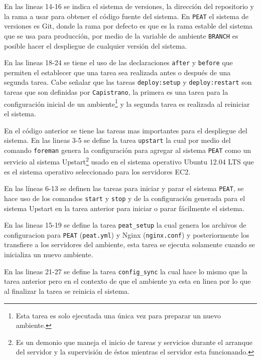 En las lineas 14-16 se indica el sistema de versiones, la dirección del repositorio
y la rama a usar para obtener el código fuente del sistema.
En \texttt{PEAT} el sistema de versiones es Git, donde la rama por defecto
es  que es la rama estable del sistema que
se usa para producción, por medio de la variable de ambiente \texttt{BRANCH} es
posible hacer el despliegue de cualquier versión del sistema.

En las lineas 18-24 se tiene el uso de las declaraciones \texttt{after}
y \texttt{before} que permiten el establecer que una tarea sea realizada
antes o después de una segunda tarea. Cabe señalar que las tareas
\texttt{deploy:setup} y \texttt{deploy:restart} son tareas que son definidas
por \texttt{Capistrano}, la primera es una tarea para la configuración inicial
de un ambiente\footnote{Esta tarea es solo ejecutada una única vez para preparar
  un nuevo ambiente.} y la segunda tarea es realizada al reiniciar el sistema.



En el código anterior se tiene las tareas mas importantes para el
despliegue del sistema. En las lineas 3-5 se define la tarea \texttt{upstart}
la cual por medio del comando \texttt{foreman} genera la configuración para agregar
al sistema \texttt{PEAT} como un servicio al sistema Upstart\footnote{Es un demonio
  que maneja el inicio de tareas y servicios durante el arranque del servidor y la
  supervisión de éstos mientras el servidor esta funcionando.} usado en el sistema
operativo Ubuntu 12.04 LTS que es el sistema operativo seleccionado para los
servidores EC2.

En las líneas 6-13 se definen las tareas para iniciar y parar el sistema
\texttt{PEAT}, se hace uso de los comandos \texttt{start} y \texttt{stop} y
de la configuración generada para el sistema Upstart en la tarea anterior para
iniciar o parar fácilmente el sistema.

En las lineas 15-19 se define la tarea \texttt{peat\_setup} la cual genera
los archivos de configuracion para \texttt{PEAT} (\texttt{peat.yml}) y
Nginx (\texttt{nginx.conf}) y posteriormente los transfiere a los servidores
del ambiente, esta tarea se ejecuta solamente cuando se inicializa un nuevo
ambiente.

En las lineas 21-27 se define la tarea \texttt{config\_sync} la cual
hace lo mismo que la tarea anterior pero en el contexto de que el ambiente
ya esta en linea por lo que al finalizar la tarea se reinicia el sistema.

